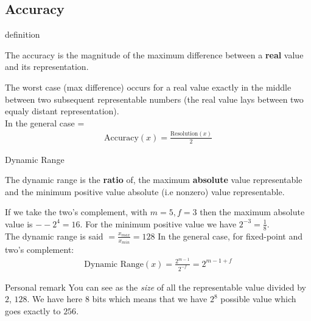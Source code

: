     \subsection{Accuracy}
    \begin{parag}{definition}
    \begin{definition}
        The accuracy is the magnitude of the maximum difference between a \textbf{real} value and its representation.
    \end{definition}
    
    The worst case (max difference) occurs for a real value exactly in the middle between two subsequent representable numbers (the real value lays between two equaly distant representation).
    \\
    In the general case = 
    \begin{align*}
        \text{Accuracy}(x) = \frac{ \text{Resolution} (x)}{2}
    \end{align*}    
    \end{parag}
    \begin{parag}{Dynamic Range}
        \begin{definition}
            The dynamic range is the \textbf{ratio} of, the maximum \textbf{absolute} value representable and the minimum positive value absolute (i.e nonzero) value representable.
        \end{definition}
        If we take the two's complement, with $m = 5, f=3$ then the maximum absolute value is $- -2^4 = 16$. For the minimum positive value we have $2^{-3} = \frac{1}{8}$. \\
    The dynamic range is said $ = \frac{x_{max}}{x_{min}} = 128$
In the general case, for fixed-point and two's complement:
\begin{align*}
    \text{Dynamic Range}(x) = \frac{2^{m-1}}{2^{-f}} = 2^{m-1 + f}
\end{align*}
\begin{subparag}{Personal remark}
    You can see as the \textit{size} of all the representable value divided by $2$, $128$. We have here $8$ bits which means that we have $2^8$ possible value which goes exactly to $256$.
\end{subparag}

        
    \end{parag}
    
